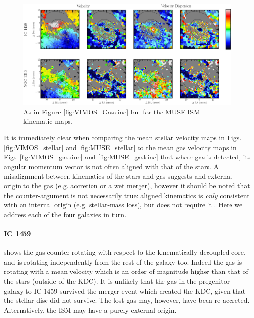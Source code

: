 	\begin{figure}
		\centering
		\includegraphics[height=0.31\textheight]{chapter5/muse/kin.png}
		\caption[MUSE ISM kinematic maps]{As in Figure \ref{fig:VIMOS_Gaskine} but for the MUSE ISM kinematic maps.}
		\label{fig:MUSE_Gaskine}
	\end{figure}


	It is immediately clear when comparing the mean stellar velocity maps in Figs.\,\ref{fig:VIMOS_stellar} and \ref{fig:MUSE_stellar} to the mean gas velocity maps in Figs.\,\ref{fig:VIMOS_gaskine} and \ref{fig:MUSE_gaskine} that where gas is detected, its angular momentum vector is not often aligned with that of the stars. A misalignment between kinematics of the stars and gas suggests and external origin to the gas (e.g. accretion or a wet merger), however it should be noted that the counter-argument is not necessarily true: aligned kinematics is \textit{only} consistent with an internal origin (e.g. stellar-mass loss), but does not require it \citep[e.g.][]{Davis2011a}. Here we address each of the four galaxies in turn. 

	\paragraph{IC 1459} shows the gas counter-rotating with respect to the kinematically-decoupled core, and is rotating independently from the rest of the galaxy too. Indeed the gas is rotating with a mean velocity which is an order of magnitude higher than that of the stars (outside of the KDC). It is unlikely that the gas in the progenitor galaxy to IC 1459 survived the merger event which created the KDC, given that the stellar disc did not survive. The lost gas may, however, have been re-accreted. Alternatively, the ISM may have a purely external origin. 

